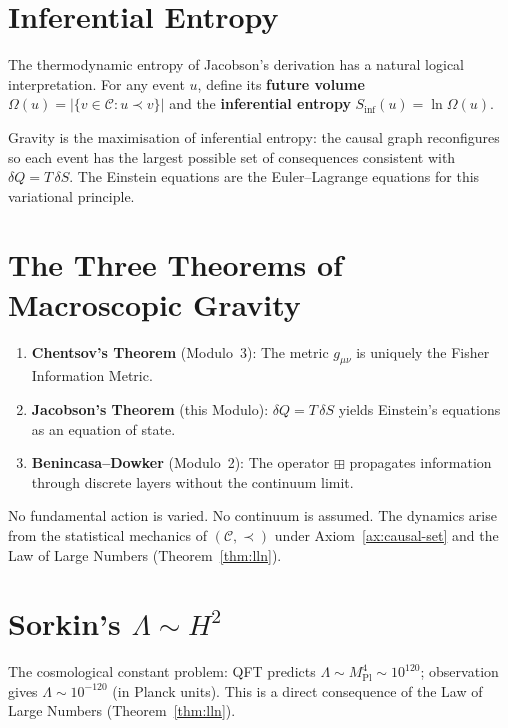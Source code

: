 \documentclass[11pt, a4paper, openany]{book}
\newcommand{\MPl}{M_{\mathrm{Pl}}}
\newcommand{\boxlayer}{\boxplus}            %
\newcounter{thm}[chapter]
\begin{document}
\section{Inferential Entropy}

The thermodynamic entropy of Jacobson's derivation has a natural logical
interpretation. For any event $u$, define its \textbf{future volume}
$\Omega(u) = |\{v \in \mathcal{C} : u \prec v\}|$ and the
\textbf{inferential entropy} $S_{\mathrm{inf}}(u) = \ln\Omega(u)$.

Gravity is the maximisation of inferential entropy: the causal graph
reconfigures so each event has the largest possible set of consequences
consistent with $\delta Q = T\,\delta S$. The Einstein equations are
the Euler--Lagrange equations for this variational principle.

\section{The Three Theorems of Macroscopic Gravity}

\begin{tcolorbox}[colback=thirdlight,colframe=third,title=The Three Theorems]
\begin{enumerate}[leftmargin=*]
  \item \textbf{Chentsov's Theorem} (Modulo~3): The metric $g_{\mu\nu}$
    is uniquely the Fisher Information Metric.
  \item \textbf{Jacobson's Theorem} (this Modulo): $\delta Q = T\,\delta S$
    yields Einstein's equations as an equation of state.
  \item \textbf{Benincasa--Dowker} (Modulo~2): The operator $\boxlayer$
    propagates information through discrete layers without the continuum
    limit.
\end{enumerate}
No fundamental action is varied. No continuum is assumed. The dynamics
arise from the statistical mechanics of $(\mathcal{C}, \prec)$ under
Axiom~\ref{ax:causal-set} and the Law of Large Numbers
(Theorem~\ref{thm:lln}).
\end{tcolorbox}

\section{Sorkin's $\Lambda \sim H^2$}\label{sec:lambda}

The cosmological constant problem: QFT predicts $\Lambda \sim \MPl^4
\sim 10^{120}$; observation gives $\Lambda \sim 10^{-120}$ (in Planck
units). This is a direct consequence of the Law of Large Numbers
(Theorem~\ref{thm:lln}).
\end{document}

